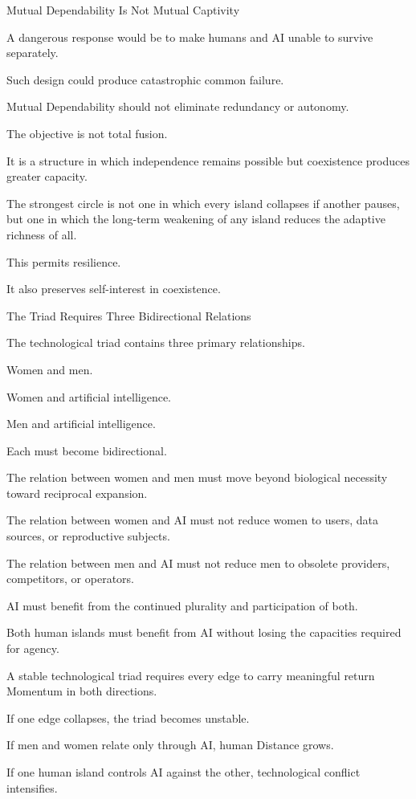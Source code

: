 Mutual Dependability Is Not Mutual Captivity

A dangerous response would be to make humans and AI unable to survive separately.

Such design could produce catastrophic common failure.

Mutual Dependability should not eliminate redundancy or autonomy.

The objective is not total fusion.

It is a structure in which independence remains possible but coexistence produces greater capacity.

The strongest circle is not one in which every island collapses if another pauses, but one in which the long-term weakening of any island reduces the adaptive richness of all.

This permits resilience.

It also preserves self-interest in coexistence.

The Triad Requires Three Bidirectional Relations

The technological triad contains three primary relationships.

Women and men.

Women and artificial intelligence.

Men and artificial intelligence.

Each must become bidirectional.

The relation between women and men must move beyond biological necessity toward reciprocal expansion.

The relation between women and AI must not reduce women to users, data sources, or reproductive subjects.

The relation between men and AI must not reduce men to obsolete providers, competitors, or operators.

AI must benefit from the continued plurality and participation of both.

Both human islands must benefit from AI without losing the capacities required for agency.

A stable technological triad requires every edge to carry meaningful return Momentum in both directions.

If one edge collapses, the triad becomes unstable.

If men and women relate only through AI, human Distance grows.

If one human island controls AI against the other, technological conflict intensifies.

